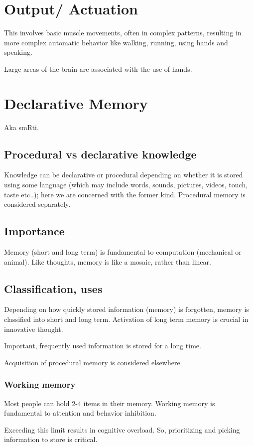 \documentclass[oneside, article]{memoir}
\begin{document}
\chapter{Output/ Actuation}
This involves basic muscle movements, often in complex patterns, resulting in more complex automatic behavior like walking, running, using hands and speaking.

Large areas of the brain are associated with the use of hands.

\chapter{Declarative Memory}
Aka smRti.

\section{Procedural vs declarative knowledge}
Knowledge can be declarative or procedural depending on whether it is stored using some language (which may include words, sounds, pictures, videos, touch, taste etc..); here we are concerned with the former kind. Procedural memory is considered separately. 

\section{Importance}
Memory (short and long term) is fundamental to computation (mechanical or animal). Like thoughts, memory is like a mosaic, rather than linear.

\section{Classification, uses}
Depending on how quickly stored information (memory) is forgotten, memory is classified into short and long term. Activation of long term memory is crucial in innovative thought.

Important, frequently used information is stored for a long time.

Acquisition of procedural memory is considered elsewhere.

\subsection{Working memory}
Most people can hold 2-4 items in their memory. Working memory is fundamental to attention and behavior inhibition.

Exceeding this limit results in cognitive overload. So, prioritizing and picking information to store is critical. 
\end{document}
